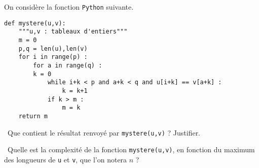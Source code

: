 \exer{}
\setcounter{numques}{0}

On considère la fonction \texttt{Python} suivante. 
\begin{lstlisting}
def mystere(u,v):
    """u,v : tableaux d'entiers"""
    m = 0
    p,q = len(u),len(v)
    for i in range(p) : 
        for a in range(q) :
	    k = 0
            while i+k < p and a+k < q and u[i+k] == v[a+k] : 
                k = k+1
            if k > m : 
                m = k
    return m
\end{lstlisting}

\medskip

\question\ Que contient le résultat renvoyé par \texttt{mystere(u,v)} ? Justifier. 

\medskip

\question\ Quelle est la complexité de la fonction \texttt{mystere(u,v)}, en fonction du maximum des longueurs de \texttt{u} et \texttt{v}, que l'on notera $n$ ? 